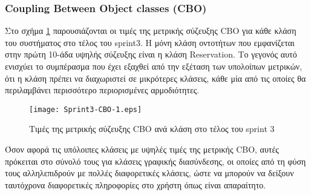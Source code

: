 \subsubsection{Coupling Between Object classes (CBO)}
\label{section:sprint3CBO}

Στο σχήμα \ref{fig:sprint3CBO} παρουσιάζονται οι τιμές της μετρικής
σύζευξης CBO για κάθε κλάση του συστήματος στο τέλος του sprint3.
Η μόνη κλάση οντοτήτων που εμφανίζεται στην πρώτη 10-άδα υψηλής
σύζευξης είναι η κλάση Reservation. Το γεγονός αυτό ενισχύει το
συμπέρασμα που έχει εξαχθεί από την εξέταση των υπολοίπων μετρικών, ότι
η κλάση πρέπει να διαχωριστεί σε μικρότερες κλάσεις, κάθε μία από τις
οποίες θα περιλαμβάνει περισσότερο περιορισμένες αρμοδιότητες.

\begin{figure}
\centering
\texttt{[image: Sprint3-CBO-1.eps]}
\caption{Τιμές της μετρικής σύζευξης CBO ανά κλάση στο τέλος του sprint 3}
\label{fig:sprint3CBO}
\end{figure}

Όσον αφορά τις υπόλοιπες κλάσεις με υψηλές τιμές της μετρικής CBO, αυτές
πρόκειται στο σύνολό τους για κλάσεις γραφικής διασύνδεσης, οι οποίες
από τη φύση τους αλληλεπιδρούν με πολλές διαφορετικές κλάσεις, ώστε να
μπορούν να δείξουν ταυτόχρονα διαφορετικές πληροφορίες στο χρήστη όπως
είναι απαραίτητο.
